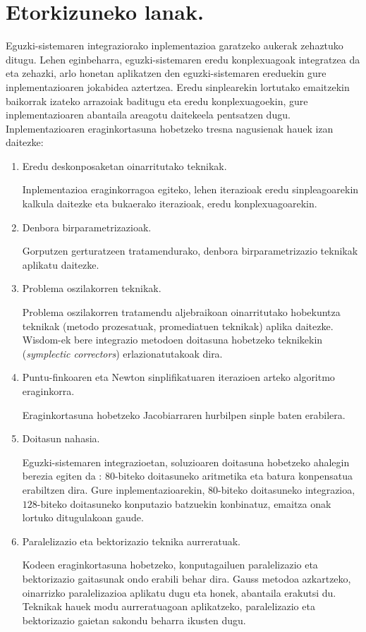 \section*{Etorkizuneko lanak.}


Eguzki-sistemaren integraziorako inplementazioa garatzeko aukerak zehaztuko ditugu. Lehen eginbeharra, eguzki-sistemaren eredu konplexuagoak integratzea da eta zehazki, arlo honetan  aplikatzen den eguzki-sistemaren ereduekin \cite{Laskar2011} gure inplementazioaren jokabidea aztertzea. Eredu sinplearekin lortutako emaitzekin baikorrak izateko arrazoiak baditugu eta eredu konplexuagoekin, gure inplementazioaren abantaila areagotu daitekeela pentsatzen dugu. Inplementazioaren eraginkortasuna hobetzeko tresna nagusienak hauek izan daitezke:


\begin{enumerate}
\item Eredu deskonposaketan oinarritutako teknikak.

Inplementazioa eraginkorragoa egiteko, lehen iterazioak eredu sinpleagoarekin kalkula daitezke eta bukaerako iterazioak, eredu konplexuagoarekin.

\item Denbora birparametrizazioak.

Gorputzen gerturatzeen tratamendurako, denbora birparametrizazio teknikak aplikatu daitezke. 

\item Problema oszilakorren teknikak.

Problema oszilakorren tratamendu aljebraikoan oinarritutako hobekuntza teknikak (metodo prozesatuak, promediatuen teknikak) aplika daitezke.
Wisdom-ek \cite{Wisdom2006} bere integrazio metodoen doitasuna hobetzeko teknikekin (\emph{symplectic correctors}) erlazionatutakoak dira.

\item Puntu-finkoaren eta Newton sinplifikatuaren iterazioen arteko algoritmo eraginkorra.

Eraginkortasuna hobetzeko Jacobiarraren hurbilpen sinple baten erabilera. 

\item Doitasun nahasia.

Eguzki-sistemaren integrazioetan, soluzioaren doitasuna hobetzeko ahalegin berezia egiten da \cite{Laskar2015}: $80$-biteko doitasuneko aritmetika eta batura konpensatua erabiltzen dira. Gure inplementazioarekin, $80$-biteko doitasuneko integrazioa, $128$-biteko doitasuneko konputazio batzuekin konbinatuz, emaitza onak lortuko ditugulakoan gaude.  

 
\item Paralelizazio eta bektorizazio teknika aurreratuak.

Kodeen eraginkortasuna hobetzeko, konputagailuen paralelizazio eta bektorizazio gaitasunak ondo erabili behar dira. Gauss metodoa azkartzeko, oinarrizko paralelizazioa aplikatu dugu eta honek, abantaila erakutsi du. Teknikak hauek modu aurreratuagoan aplikatzeko,  paralelizazio eta bektorizazio gaietan sakondu beharra ikusten dugu. 


\end{enumerate} 








